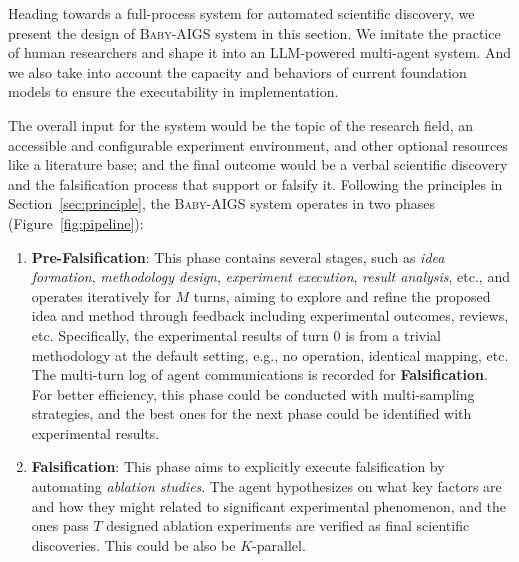 \documentclass{article} %
\newcommand{\AIGSSys}{\textsc{Baby-AIGS}\xspace}
\newcommand{\DSL}{\textsc{DSL}\xspace}
\begin{document}

Heading towards a full-process system for automated scientific discovery, we present the design of \AIGSSys system in this section. We imitate the practice of human researchers and shape it into an LLM-powered multi-agent system. And we also take into account the capacity and behaviors of current foundation models to ensure the executability in implementation. 

The overall input for the system would be the topic of the research field, an accessible and configurable experiment environment, and other optional resources like a literature base; and the final outcome would be a verbal scientific discovery and the falsification process that support or falsify it. 
Following the principles in Section~\ref{sec:principle}, the \AIGSSys system operates in two phases (Figure~\ref{fig:pipeline}): 
\begin{enumerate}
    \item \textbf{Pre-Falsification}: This phase contains several stages, such as \textit{idea formation}, \textit{methodology design}, \textit{experiment execution}, \textit{result analysis}, etc., and operates iteratively for $M$ turns, aiming to explore and refine the proposed idea and method through feedback including experimental outcomes, reviews, etc. Specifically, the experimental results of turn 0 is from a trivial methodology at the default setting, e.g., no operation, identical mapping, etc. The multi-turn log of agent communications is recorded for \textbf{Falsification}. For better efficiency, this phase could be conducted with multi-sampling strategies, and the best ones for the next phase could be identified with experimental results. 
    \item \textbf{Falsification}: This phase aims to explicitly execute falsification by automating \textit{ablation studies}. The agent hypothesizes on what key factors are and how they might related to significant experimental phenomenon, and the ones pass $T$ designed ablation experiments are verified as final scientific discoveries. This could be also be $K$-parallel. 
\end{enumerate}


\end{document}
